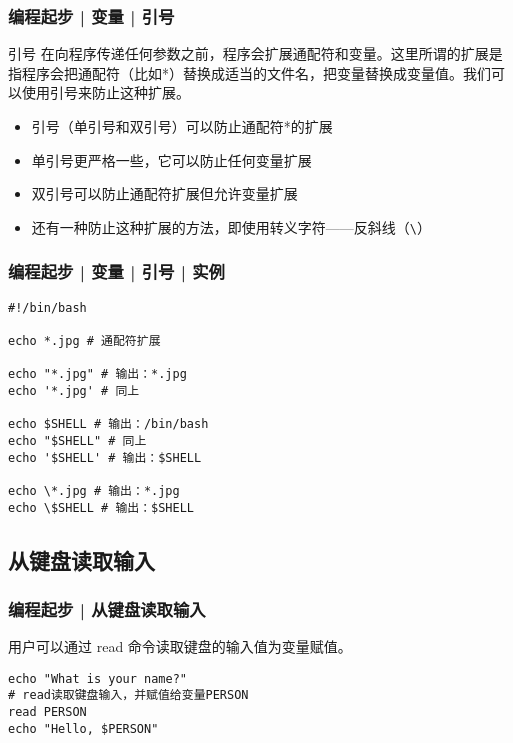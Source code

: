 \begin{frame}[fragile]
  \frametitle{编程起步 | 变量 | \alert{引号}}
  \begin{block}{引号}
    在向程序传递任何参数之前，程序会扩展通配符和变量。这里所谓的扩展是指程序会把通配符（比如*）替换成适当的文件名，把变量替换成变量值。我们可以使用引号来防止这种扩展。
    \begin{itemize}
      \item 引号（单引号和双引号）可以防止通配符*的扩展
      \item 单引号更严格一些，它可以防止任何变量扩展
      \item 双引号可以防止通配符扩展但允许变量扩展
      \item 还有一种防止这种扩展的方法，即使用转义字符——反斜线（\verb|\|）
    \end{itemize}
  \end{block}
\end{frame}

\begin{frame}[fragile]
  \frametitle{编程起步 | 变量 | 引号 | \alert{实例}}
\begin{lstlisting}
#!/bin/bash

echo *.jpg # 通配符扩展

echo "*.jpg" # 输出：*.jpg
echo '*.jpg' # 同上

echo $SHELL # 输出：/bin/bash
echo "$SHELL" # 同上
echo '$SHELL' # 输出：$SHELL

echo \*.jpg # 输出：*.jpg
echo \$SHELL # 输出：$SHELL
\end{lstlisting}
\end{frame}


\subsection{从键盘读取输入}
\begin{frame}[fragile]
  \frametitle{编程起步 | 从键盘读取输入}
  用户可以通过 \alert{read} 命令读取键盘的输入值为变量赋值。
\begin{lstlisting}
echo "What is your name?"
# read读取键盘输入，并赋值给变量PERSON
read PERSON
echo "Hello, $PERSON"
\end{lstlisting}
\end{frame}

